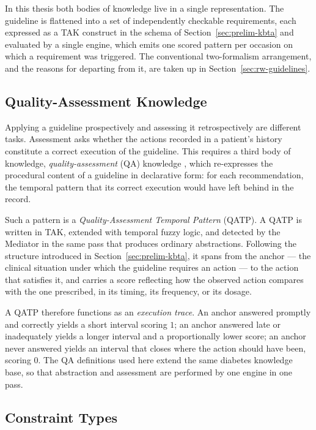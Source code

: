 In this thesis both bodies of knowledge live in a single representation. The guideline is flattened into a set of independently checkable requirements, each expressed as a TAK construct in the schema of Section~\ref{sec:prelim-kbta} and evaluated by a single engine, which emits one scored pattern per occasion on which a requirement was triggered. The conventional two-formalism arrangement, and the reasons for departing from it, are taken up in Section~\ref{sec:rw-guidelines}.

\subsection{Quality-Assessment Knowledge}

Applying a guideline prospectively and assessing it retrospectively are different tasks. Assessment asks whether the actions recorded in a patient's history constitute a correct execution of the guideline. This requires a third body of knowledge, \emph{quality-assessment} (QA) knowledge \citep{supporting-episodic-application-clinical-guidelines}, which re-expresses the procedural content of a guideline in declarative form: for each recommendation, the temporal pattern that its correct execution would have left behind in the record.

Such a pattern is a \emph{Quality-Assessment Temporal Pattern} (QATP). A QATP is written in TAK, extended with temporal fuzzy logic, and detected by the Mediator in the same pass that produces ordinary abstractions. Following the structure introduced in Section~\ref{sec:prelim-kbta}, it spans from the anchor --- the clinical situation under which the guideline requires an action --- to the action that satisfies it, and carries a score reflecting how the observed action compares with the one prescribed, in its timing, its frequency, or its dosage.

A QATP therefore functions as an \emph{execution trace}. An anchor answered promptly and correctly yields a short interval scoring $1$; an anchor answered late or inadequately yields a longer interval and a proportionally lower score; an anchor never answered yields an interval that closes where the action should have been, scoring $0$. The QA definitions used here extend the same diabetes knowledge base, so that abstraction and assessment are performed by one engine in one pass.

\subsection{Constraint Types}

